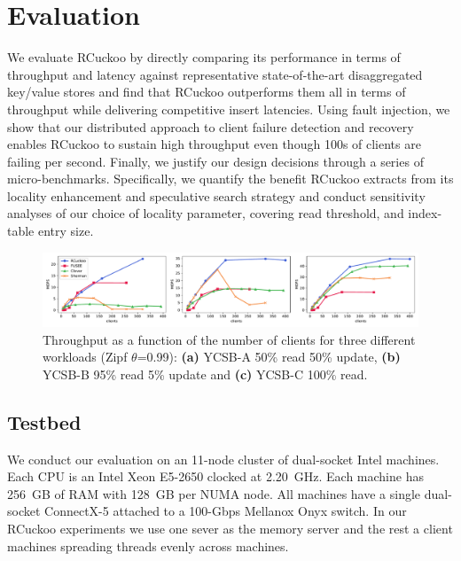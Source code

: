 \section{Evaluation}
\label{sec:eval}

We evaluate RCuckoo by directly comparing its performance in terms of
throughput and latency against representative state-of-the-art
disaggregated key/value stores and find that RCuckoo outperforms them
all in terms of throughput while delivering competitive insert
latencies.  Using fault injection, we show that our distributed
approach to client failure detection and recovery enables RCuckoo to
sustain high throughput even though 100s of clients are failing per
second.  Finally, we justify our design decisions through a series of
micro-benchmarks. Specifically, we quantify the benefit RCuckoo
extracts from its locality enhancement and speculative search strategy
and conduct sensitivity analyses of our choice of locality parameter,
covering read threshold, and index-table entry size.



\begin{figure}[ht]
    \includegraphics[width=0.99\linewidth]{fig/hero_ycsb_throughput.pdf}

    \caption{Throughput as a function of the number of clients for three different workloads (Zipf $\theta$=0.99): \textbf{(a)} YCSB-A 50\%
    read 50\% update, \textbf{(b)} YCSB-B 95\% read 5\% update and \textbf{(c)}
    YCSB-C 100\% read.}
    \label{fig:ycsb_throughput}
 \end{figure}


\subsection{Testbed}

We conduct our evaluation on an 11-node cluster of dual-socket Intel
machines. Each CPU is an Intel Xeon E5-2650 clocked at
2.20~GHz. Each machine has 256~GB of RAM with 128~GB per NUMA
node. All machines have a single dual-socket ConnectX-5 attached to a
100-Gbps Mellanox Onyx switch. In our RCuckoo experiments we use one
sever as the memory server and the rest a client machines
spreading threads evenly across machines.

